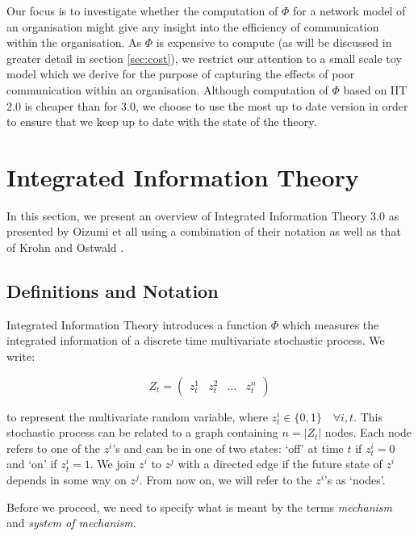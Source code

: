 Our focus is to investigate whether the computation of $\Phi$ for a network model of an organisation might give any insight into the efficiency of communication within the organisation. As $\Phi$ is expensive to compute (as will be discussed in greater detail in section \ref{sec:cost}), we restrict our attention to a small scale toy model which we derive for the purpose of capturing the effects of poor communication within an organisation. Although computation of $\Phi$ based on IIT 2.0 is cheaper than for 3.0, we choose to use the most up to date version in order to ensure that we keep up to date with the state of the theory. 

\section{Integrated Information Theory}
\label{sec:iit}

In this section, we present an overview of Integrated Information Theory 3.0 as presented by Oizumi et all \cite{oizumi2014phenomenology} using a combination of their notation as well as that of Krohn and Ostwald \cite{krohn2016computing}.

\subsection{Definitions and Notation}

Integrated Information Theory introduces a function $\Phi$ which measures the integrated information of a discrete time multivariate stochastic process. We write:

\begin{equation}
\label{def:1}
Z_t = \left(\begin{array}{cccc} z^1_t&z^2_t&\ldots&z^n_t\end{array}\right)
\end{equation}

to represent the multivariate random variable, where $z^i_t \in \{0,1\} \quad\forall i, t$. This stochastic process can be related to a graph containing $n = |Z_t|$ nodes. Each node refers to one of the $z^i$'s and can be in one of two states: `off' at time $t$ if $z^i_t=0$ and `on' if $z^i_t = 1$. We join $z^i$ to $z^j$ with a directed edge if the future state of $z^i$ depends in some way on $z^j$. From now on, we will refer to the $z^i$'s as `nodes'.

Before we proceed, we need to specify what is meant by the terms \textit{mechanism} and \textit{system of mechanism}.

